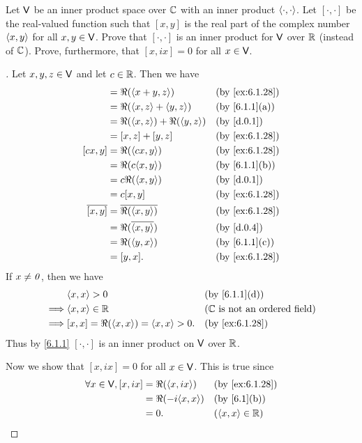 \begin{ex}\label{ex:6.1.28}
	Let \(\mathsf{V}\) be an inner product space over \(\mathbb{C}\) with an inner product \(\left\langle\cdot, \cdot\right\rangle\).
	Let \([\cdot, \cdot]\) be the real-valued function such that \([x, y]\) is the real part of the complex number \(\left\langle x, y\right\rangle\) for all \(x, y \in \mathsf{V}\).
	Prove that \([\cdot, \cdot]\) is an inner product for \(\mathsf{V}\) over \(\mathbb{R}\) (instead of \(\mathbb{C}\)).
	Prove, furthermore, that \([x, ix] = 0\) for all \(x \in \mathsf{V}\).
\end{ex}

\begin{proof}[]
	Let \(x, y, z \in \mathsf{V}\) and let \(c \in \mathbb{R}\).
	Then we have
	\begin{align*}
		[x + y, z]    & = \Re(\inn{x + y, z})               &  & \by{ex:6.1.28} \\
		              & = \Re(\inn{x, z} + \inn{y, z})      &  & \by{6.1.1}[a]  \\
		              & = \Re(\inn{x, z}) + \Re(\inn{y, z}) &  & \by{d.0.1}     \\
		              & = [x, z] + [y, z]                   &  & \by{ex:6.1.28} \\
		[cx, y]       & = \Re(\inn{cx, y})                  &  & \by{ex:6.1.28} \\
		              & = \Re(c \inn{x, y})                 &  & \by{6.1.1}[b]  \\
		              & = c \Re(\inn{x, y})                 &  & \by{d.0.1}     \\
		              & = c [x, y]                          &  & \by{ex:6.1.28} \\
		\conj{[x, y]} & = \conj{\Re(\inn{x, y})}            &  & \by{ex:6.1.28} \\
		              & = \Re(\conj{\inn{x, y}})            &  & \by{d.0.4}     \\
		              & = \Re(\inn{y, x})                   &  & \by{6.1.1}[c]  \\
		              & = [y, x].                           &  & \by{ex:6.1.28}
	\end{align*}
	If \(x \neq \mathit{0}\), then we have
	\begin{align*}
		         & \inn{x, x} > 0                             &  & \by{6.1.1}[d]                           \\
		\implies & \inn{x, x} \in \R                          &  & \text{(\(\C\) is not an ordered field)} \\
		\implies & [x, x] = \Re(\inn{x, x}) = \inn{x, x} > 0. &  & \by{ex:6.1.28}
	\end{align*}
	Thus by \cref{6.1.1} \([\cdot, \cdot]\) is an inner product on \(\mathsf{V}\) over \(\mathbb{R}\).

	Now we show that \([x, ix] = 0\) for all \(x \in \mathsf{V}\).
	This is true since
	\begin{align*}
		\forall x \in \V, [x, ix] & = \Re(\inn{x, ix})   &  & \by{ex:6.1.28}      \\
		                          & = \Re(-i \inn{x, x}) &  & \by{6.1}[b]         \\
		                          & = 0.                 &  & (\inn{x, x} \in \R)
	\end{align*}
\end{proof}

